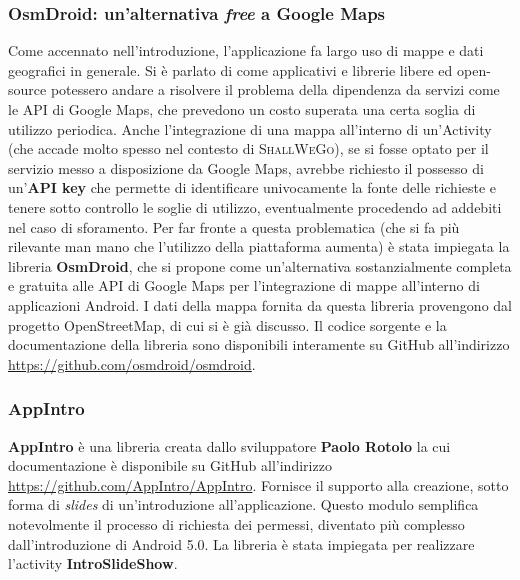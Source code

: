                 \subsubsection{OsmDroid: un'alternativa \textit{free} a Google Maps}
                    Come accennato nell'introduzione, l'applicazione fa largo uso di mappe e dati geografici in generale. Si è parlato di come applicativi e librerie libere ed open-source potessero andare a risolvere il problema della dipendenza da servizi come le API di Google Maps, che prevedono un costo superata una certa soglia di utilizzo periodica. Anche l'integrazione di una mappa all'interno di un'Activity (che accade molto spesso nel contesto di \textsc{ShallWeGo}), se si fosse optato per il servizio messo a disposizione da Google Maps, avrebbe richiesto il possesso di un'\textbf{API key} che permette di identificare univocamente la fonte delle richieste e tenere sotto controllo le soglie di utilizzo, eventualmente procedendo ad addebiti nel caso di sforamento. Per far fronte a questa problematica (che si fa più rilevante man mano che l'utilizzo della piattaforma aumenta) è stata impiegata la libreria \textbf{OsmDroid}, che si propone come un'alternativa sostanzialmente completa e gratuita alle API di Google Maps per l'integrazione di mappe all'interno di applicazioni Android. I dati della mappa fornita da questa libreria provengono dal progetto OpenStreetMap, di cui si è già discusso. Il codice sorgente e la documentazione della libreria sono disponibili interamente su GitHub all'indirizzo \url{https://github.com/osmdroid/osmdroid}.

                \subsubsection{AppIntro}
                    \textbf{AppIntro} è una libreria creata dallo sviluppatore \textbf{Paolo Rotolo} la cui documentazione è disponibile su GitHub all'indirizzo \url{https://github.com/AppIntro/AppIntro}. Fornisce il supporto alla creazione, sotto forma di \textit{slides} di un'introduzione all'applicazione. Questo modulo semplifica notevolmente il processo di richiesta dei permessi, diventato più complesso dall'introduzione di Android 5.0.
                    La libreria è stata impiegata per realizzare l'activity \textbf{IntroSlideShow}.

